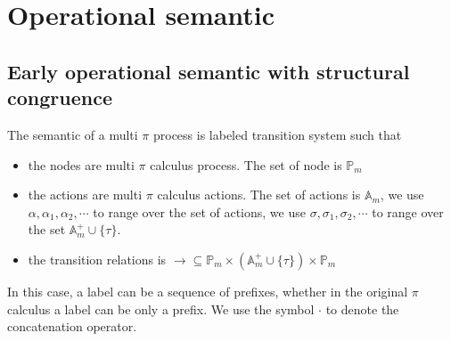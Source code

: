 \section{Operational semantic}

\subsection{Early operational semantic with structural congruence}

The semantic of a multi $\pi$ process is labeled transition system such that
\begin{itemize}
  \item 
    the nodes are multi $\pi$ calculus process. The set of node is $\mathbb{P}_{m}$
  \item
    the actions are multi $\pi$ calculus actions. The set of actions is $\mathbb{A}_{m}$, we use $\alpha, \alpha_{1}, \alpha_{2},\cdots $ to range over the set of actions, we use $\sigma, \sigma_{1}, \sigma_{2}, \cdots $ to range over the set $\mathbb{A}_{m}^{+} \cup \{\tau\}$.
  \item
    the transition relations is $\rightarrow\subseteq \mathbb{P}_{m}\times (\mathbb{A}_{m}^{+} \cup \{\tau\})\times \mathbb{P}_{m}$
\end{itemize}

In this case, a label can be a sequence of prefixes, whether in the original $\pi$ calculus a label can be only a prefix. We use the symbol $\cdot$ to denote the concatenation operator.


